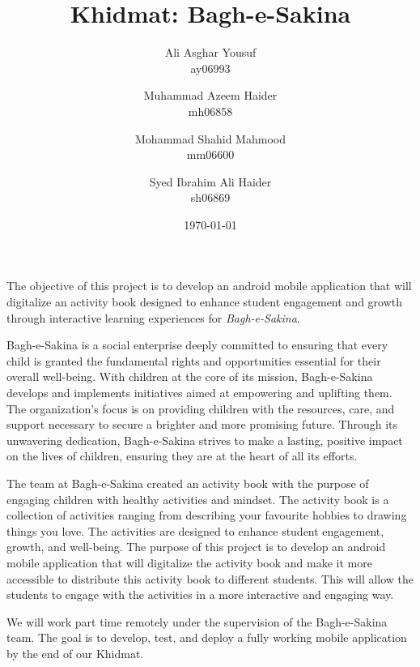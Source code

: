 \documentclass{article}
\title {Khidmat: Bagh-e-Sakina}
\author{
  Ali Asghar Yousuf\\ ay06993
  \and
  Muhammad Azeem Haider\\ mh06858
  \and
  Mohammad Shahid Mahmood\\ mm06600
  \and
  Syed Ibrahim Ali Haider\\ sh06869
}
\date{\today}
\begin{document}
\maketitle



The objective of this project is to develop an android mobile application that will digitalize an activity book designed to enhance student engagement and growth through interactive learning experiences for \textit{Bagh-e-Sakina}.

\vspace{1em}

Bagh-e-Sakina is a social enterprise deeply committed to ensuring that every child is granted the fundamental rights and opportunities essential for their overall well-being. With children at the core of its mission, Bagh-e-Sakina develops and implements initiatives aimed at empowering and uplifting them. The organization’s focus is on providing children with the resources, care, and support necessary to secure a brighter and more promising future. Through its unwavering dedication, Bagh-e-Sakina strives to make a lasting, positive impact on the lives of children, ensuring they are at the heart of all its efforts.

\vspace{1em}

The team at Bagh-e-Sakina created an activity book with the purpose of engaging children with healthy activities and mindset. The activity book is a collection of activities ranging from describing your favourite hobbies to drawing things you love. The activities are designed to enhance student engagement, growth, and well-being. The purpose of this project is to develop an android mobile application that will digitalize the activity book and make it more accessible to distribute this activity book to different students. This will allow the students to engage with the activities in a more interactive and engaging way.

\vspace{1em}

We will work part time remotely under the supervision of the Bagh-e-Sakina team. The goal is to develop, test, and deploy a fully working mobile application by the end of our Khidmat.
\end{document}
